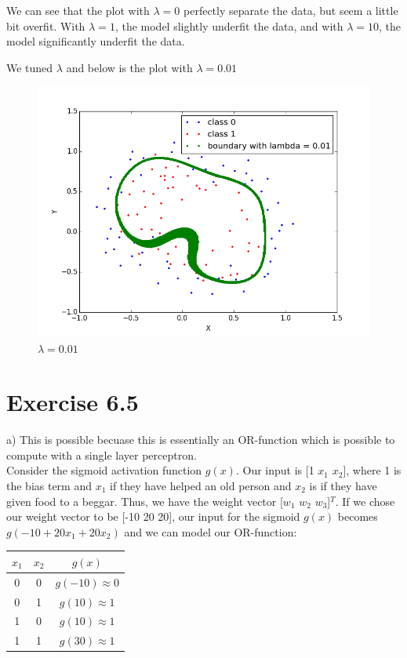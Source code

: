 \documentclass{article}
\begin{document}
\newpage
We can see that the plot with $\lambda = 0$ perfectly separate the data, but seem a little bit overfit. With $\lambda = 1$, the model slightly underfit the data, and with $\lambda = 10$, the model significantly underfit the data.

We tuned $\lambda$ and below is the plot with $\lambda = 0.01$
\begin{figure}[ht]
	\centering
	\includegraphics[scale=0.35]{lambda_good.png}
	\caption{$\lambda = 0.01$}
\end{figure}
\newpage
\section*{Exercise 6.5}
a) This is possible becuase this is essentially an OR-function which is possible to compute with a single layer perceptron.\\
Consider the sigmoid activation function $g(x)$. Our input is [1 $x_1$ $x_2$], where 1 is the bias term and $x_1$ if they have helped an old person and $x_2$ is if they have given food to a beggar. Thus, we have the weight vector [$w_1$ $w_2$ $w_3$]$^T$. If we chose our weight vector to be [-10 20 20], our input for the sigmoid $g(x)$ becomes $g(-10 + 20 x_1 + 20 x_2)$ and we can model our OR-function:
\begin{center}
  \begin{tabular}{ c | c | c }
   $x_1$ & $x_2$ & $g(x)$ \\ \hline
    0 & 0 & $g(-10) \approx 0$ \\
    0 & 1 & $g(10) \approx 1$ \\
    1 & 0 & $g(10) \approx 1$ \\
    1 & 1 & $g(30) \approx 1$
  \end{tabular}
\end{center}
\end{document}
